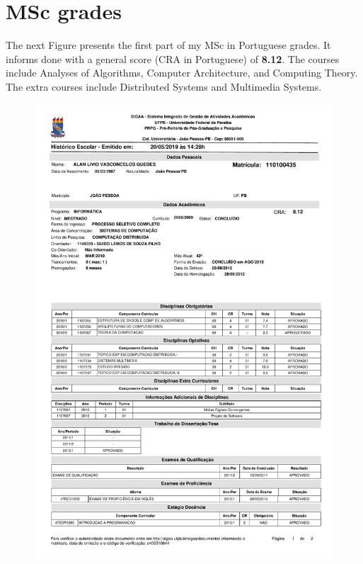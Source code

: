 \documentclass[10pt,a4paper,sans,colorlinks]{moderncv}
\begin{document}
\section{MSc grades}
The next Figure presents the first part of my MSc in Portuguese grades.
It informs done with a general score (CRA in Portuguese) of \textbf{8.12}.
The courses include Analyses of Algorithms, Computer Architecture, and Computing Theory.
The extra courses include Distributed Systems and Multimedia Systems.
\vspace{1em}
\begin{figure}
    \centering
    \includegraphics[align=t,width=\textwidth,height=0.75\textheight, keepaspectratio=true, trim=0cm 0cm 0cm 2cm]{certificates/msc-grades.pdf}
\end{figure}
\end{document}
